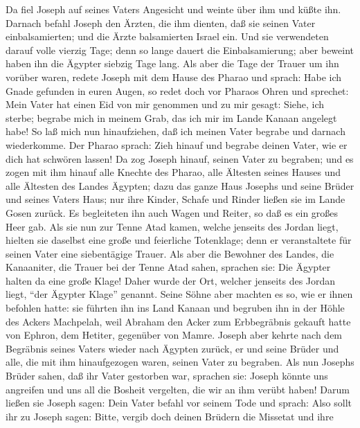  Da fiel Joseph auf seines Vaters Angesicht und weinte
über ihm und küßte ihn.  Darnach befahl Joseph den Ärzten,
die ihm dienten, daß sie seinen Vater einbalsamierten; und die Ärzte
balsamierten Israel ein.  Und sie verwendeten darauf volle
vierzig Tage; denn so lange dauert die Einbalsamierung; aber beweint
haben ihn die Ägypter siebzig Tage lang.  Als aber die
Tage der Trauer um ihn vorüber waren, redete Joseph mit dem Hause des
Pharao und sprach: Habe ich Gnade gefunden in euren Augen, so redet doch
vor Pharaos Ohren und sprechet:  Mein Vater hat einen Eid
von mir genommen und zu mir gesagt: Siehe, ich sterbe; begrabe mich in
meinem Grab, das ich mir im Lande Kanaan angelegt habe! So laß mich nun
hinaufziehen, daß ich meinen Vater begrabe und darnach wiederkomme.
 Der Pharao sprach: Zieh hinauf und begrabe deinen Vater,
wie er dich hat schwören lassen!  Da zog Joseph hinauf,
seinen Vater zu begraben; und es zogen mit ihm hinauf alle Knechte des
Pharao, alle Ältesten seines Hauses und alle Ältesten des Landes
Ägypten;  dazu das ganze Haus Josephs und seine Brüder und
seines Vaters Haus; nur ihre Kinder, Schafe und Rinder ließen sie im
Lande Gosen zurück.  Es begleiteten ihn auch Wagen und
Reiter, so daß es ein großes Heer gab.  Als sie nun zur
Tenne Atad kamen, welche jenseits des Jordan liegt, hielten sie daselbst
eine große und feierliche Totenklage; denn er veranstaltete für seinen
Vater eine siebentägige Trauer.  Als aber die Bewohner
des Landes, die Kanaaniter, die Trauer bei der Tenne Atad sahen,
sprachen sie: Die Ägypter halten da eine große Klage! Daher wurde der
Ort, welcher jenseits des Jordan liegt, ``der Ägypter Klage'' genannt.
 Seine Söhne aber machten es so, wie er ihnen befohlen
hatte:  sie führten ihn ins Land Kanaan und begruben ihn
in der Höhle des Ackers Machpelah, weil Abraham den Acker zum
Erbbegräbnis gekauft hatte von Ephron, dem Hetiter, gegenüber von Mamre.
 Joseph aber kehrte nach dem Begräbnis seines Vaters
wieder nach Ägypten zurück, er und seine Brüder und alle, die mit ihm
hinaufgezogen waren, seinen Vater zu begraben.  Als nun
Josephs Brüder sahen, daß ihr Vater gestorben war, sprachen sie: Joseph
könnte uns angreifen und uns all die Bosheit vergelten, die wir an ihm
verübt haben!  Darum ließen sie Joseph sagen: Dein Vater
befahl vor seinem Tode und sprach:  Also sollt ihr zu
Joseph sagen: Bitte, vergib doch deinen Brüdern die Missetat und ihre
